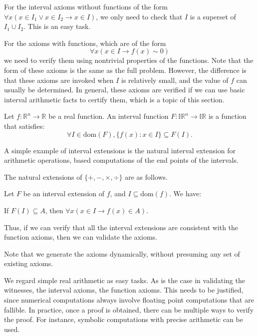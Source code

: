 \documentclass[envcountsect]{llncs}
\newcommand{\dom}{\mathrm{dom}}
\begin{document}
For the interval axioms without functions of the form $\forall x(x\in I_1\vee
x\in I_2\rightarrow x\in I)$, we only need to check that $I$ is a superset of
$I_1\cup I_2$. This is an easy task.

For the axioms with functions, which are of the form
$$\forall x (x\in I \rightarrow f(x)\sim 0)$$
we need to verify them using nontrivial properties of the functions. Note that
the form of these axioms is the same as the full problem. However, the
difference is that these axioms are invoked when $I$ is relatively small, and
the value of $f$ can usually be determined. In general, these axioms are
verified if we can use basic interval arithmetic facts to certify them, which is
a topic of this section.

\begin{definition}
Let $f: \mathbb{R}^n\rightarrow \mathbb{R}$ be a real function. An interval
function $F: \mathbb{IR}^n \rightarrow \mathbb{IR}$ is a function that
satisfies:
$$\forall I\in \dom(F), \{f(x): x\in I\}\subseteq F(I).$$
\end{definition}

A simple example of interval extensions is the natural interval extension for
arithmetic operations, based computations of the end points of the intervals.
\begin{example}
The natural extensions of $\{+, -, \times, \div\}$ are as follows.
\end{example}

\begin{proposition}
Let $F$ be an interval extension of $f$, and $I\subseteq \dom(f)$. We have:
\begin{center}
If $F(I)\subseteq A$, then $\forall x (x\in I \rightarrow f(x)\in A)$.
\end{center}
\end{proposition}
Thus, if we can verify that all the interval extensions are consistent with the
function axioms, then we can validate the axioms.

\begin{remark}
Note that we generate the axioms dynamically, without presuming any set of
existing axioms.  
\end{remark}

\begin{remark}
We regard simple real arithmetic as easy tasks.
As is the case in validating the witnesses, the interval axioms, the function
axioms. This needs to be justified, since numerical computations always involve
floating point computations that are fallible. In practice, once a proof is
obtained, there can be multiple ways to verify the proof. For instance, symbolic
computations with precise arithmetic can be used.
\end{remark}
\end{document}
